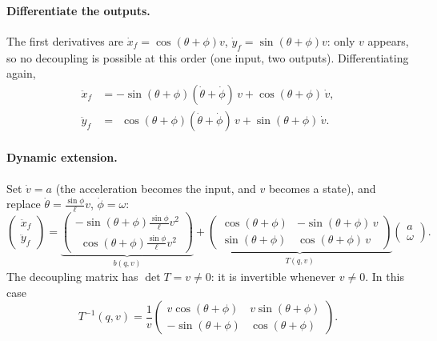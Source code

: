 \documentclass[11pt,a4paper]{article}
\def\boldsymbol#1{#1}%
\newcommand{\q}{\boldsymbol{q}}
\newcommand{\Tm}{\boldsymbol{T}}
\newcommand{\bb}{\boldsymbol{b}}
\theoremstyle{definition}
\theoremstyle{plain}
\theoremstyle{remark}
\begin{document}
\paragraph{Differentiate the outputs.} The first derivatives are $\dot x_f=\cos(\theta+\phi)v$, $\dot y_f=\sin(\theta+\phi)v$: only $v$ appears, so no decoupling is possible at this order (one input, two outputs). Differentiating again,
\begin{align*}
  \ddot x_f&=-\sin(\theta+\phi)(\dot\theta+\dot\phi)\,v+\cos(\theta+\phi)\,\dot v,\\
  \ddot y_f&=\ \ \cos(\theta+\phi)(\dot\theta+\dot\phi)\,v+\sin(\theta+\phi)\,\dot v .
\end{align*}

\paragraph{Dynamic extension.} Set $\dot v=a$ (the acceleration becomes the input, and $v$ becomes a state), and replace $\dot\theta=\frac{\sin\phi}{\ell}v$, $\dot\phi=\omega$:
\begin{equation}
  \begin{pmatrix}\ddot x_f\\ \ddot y_f\end{pmatrix}
  =\underbrace{\begin{pmatrix}-\sin(\theta+\phi)\frac{\sin\phi}{\ell}v^2\\[2pt] \ \ \cos(\theta+\phi)\frac{\sin\phi}{\ell}v^2\end{pmatrix}}_{\bb(\q,v)}
  +\underbrace{\begin{pmatrix}\cos(\theta+\phi)&-\sin(\theta+\phi)\,v\\ \sin(\theta+\phi)&\cos(\theta+\phi)\,v\end{pmatrix}}_{\Tm(\q,v)}
  \begin{pmatrix}a\\ \omega\end{pmatrix}.
\end{equation}
The decoupling matrix has $\det\Tm=v\neq0$: it is invertible whenever $v\ne0$. In this case
\[
  \Tm^{-1}(\q,v)=\frac1v\begin{pmatrix}v\cos(\theta+\phi)&v\sin(\theta+\phi)\\-\sin(\theta+\phi)&\cos(\theta+\phi)\end{pmatrix}.
\]
\end{document}
